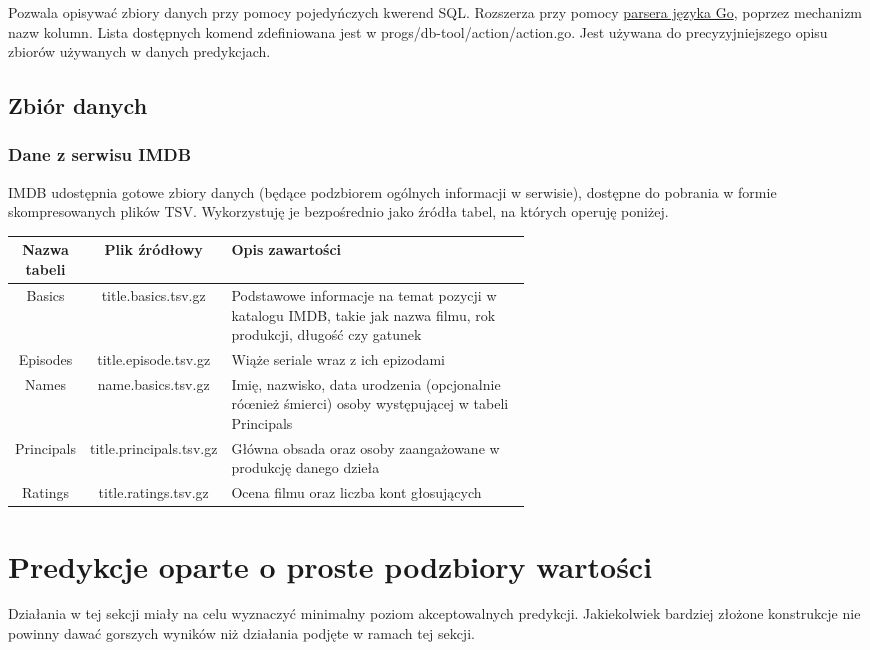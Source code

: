 \documentclass{article}
\begin{document}
Pozwala opisywać zbiory danych przy pomocy pojedyńczych kwerend SQL. Rozszerza przy pomocy \href{https://pkg.go.dev/go}{parsera języka Go}, poprzez mechanizm nazw kolumn. Lista dostępnych komend zdefiniowana jest w progs/db-tool/action/action.go. Jest używana do precyzyjniejszego opisu zbiorów używanych w danych predykcjach.

\subsection{Zbiór danych}

\subsubsection{Dane z serwisu IMDB}

IMDB udostępnia gotowe zbiory danych (będące podzbiorem ogólnych informacji w serwisie), dostępne do pobrania w formie skompresowanych plików TSV. Wykorzystuję je bezpośrednio jako źródła tabel, na których operuję poniżej.

\begin{center}
\begin{tabular}{ |c|c| p{0.6\linewidth} | }
	\hline
	\textbf{Nazwa tabeli} & \textbf{Plik źródłowy} & \textbf{Opis zawartości} \\ \hline
	Basics & title.basics.tsv.gz & Podstawowe informacje na temat pozycji w katalogu IMDB, takie jak nazwa filmu, rok produkcji, długość czy gatunek \\ \hline
	Episodes & title.episode.tsv.gz & Wiąże seriale wraz z ich epizodami \\ \hline
	Names & name.basics.tsv.gz & Imię, nazwisko, data urodzenia (opcjonalnie róœnież śmierci) osoby występującej w tabeli Principals \\ \hline
	Principals & title.principals.tsv.gz & Główna obsada oraz osoby zaangażowane w produkcję danego dzieła \\ \hline
	Ratings & title.ratings.tsv.gz & Ocena filmu oraz liczba kont głosujących \\ \hline
\end{tabular}
\end{center}

\pagebreak

\section{Predykcje oparte o proste podzbiory wartości}

Działania w tej sekcji miały na celu wyznaczyć minimalny poziom akceptowalnych predykcji. Jakiekolwiek bardziej złożone konstrukcje nie powinny dawać gorszych wyników niż działania podjęte w ramach tej sekcji.
\end{document}
